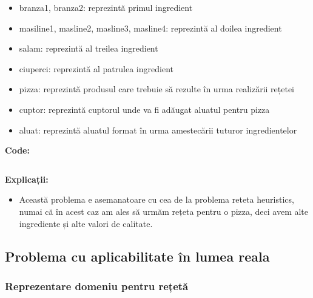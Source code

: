  \begin{itemize}
    \setlength\itemsep{0em}
    \item branza1, branza2: reprezintă primul ingredient
    \item masiline1, masline2, masline3, masline4: reprezintă al doilea ingredient
    \item salam: reprezintă al treilea ingredient
    \item ciuperci: reprezintă al patrulea ingredient
    \item pizza: reprezintă produsul care trebuie să rezulte în urma realizării rețetei
    \item cuptor: reprezintă cuptorul unde va fi adăugat aluatul pentru pizza
    \item aluat: reprezintă aluatul format în urma amestecării tuturor ingredientelor


\end{itemize}
\textbf{Code:}

    \inputminted[linenos]{C}{cod/problem2_reteta_heuristics.pddl}
    
 \textbf{ Explicații:}

  \begin{itemize}
    \setlength\itemsep{0em}
    \item Această problema e asemanatoare cu cea de la problema reteta heuristics, numai că în acest caz am ales să urmăm rețeta pentru o pizza, deci avem alte ingrediente și alte valori de calitate.

  
\end{itemize}   
    
    
    
    
    
    
    
    
    
    
\newpage





\subsection{Problema cu aplicabilitate în lumea reala}
\subsubsection{Reprezentare domeniu pentru rețetă}

